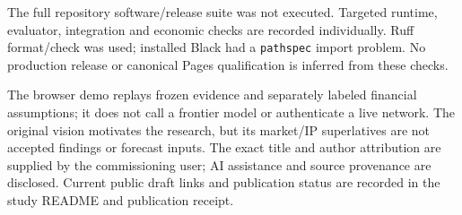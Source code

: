 \documentclass[
  10pt,
]{article}
\begin{document}
The full repository software/release suite was not executed. Targeted
runtime, evaluator, integration and economic checks are recorded
individually. Ruff format/check was used; installed Black had a
\texttt{pathspec} import problem. No production release or canonical
Pages qualification is inferred from these checks.

The browser demo replays frozen evidence and separately labeled
financial assumptions; it does not call a frontier model or authenticate
a live network. The original vision motivates the research, but its
market/IP superlatives are not accepted findings or forecast inputs. The
exact title and author attribution are supplied by the commissioning
user; AI assistance and source provenance are disclosed. Current public
draft links and publication status are recorded in the study README and
publication receipt.
\end{document}
